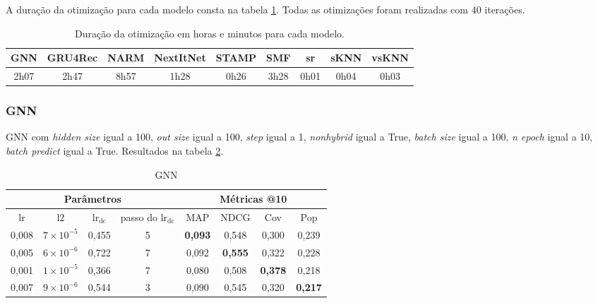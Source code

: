 A duração da otimização para cada modelo consta na tabela
\ref{tab:duration_opt_remaining}. Todas as otimizações foram realizadas com
40 iterações.

\begin{table}[htbp]
  \centering
  \begin{tabular}{|c|c|c|c|c|c|c|c|c|}
      \hline
      GNN & GRU4Rec & NARM & NextItNet & STAMP & SMF & sr & sKNN & vsKNN \\
      \hline
      2h07 & 2h47 & 8h57 & 1h28 & 0h26 & 3h28 & 0h01 & 0h04 & 0h03 \\
      \hline
      \end{tabular}
      \caption{Duração da otimização em horas e minutos para cada modelo.}
      \label{tab:duration_opt_remaining}
\end{table}

\subsubsection{GNN}
GNN com \textit{hidden size} igual a 100, \textit{out size} igual a 100,
\textit{step} igual a 1, \textit{nonhybrid} igual a True, \textit{batch size}
igual a 100, \textit{n epoch} igual a 10, \textit{batch predict} igual a True.
Resultados na tabela \ref{opt:GNN_rem}.

\begin{table}[htbp]
  \centering
  \begin{tabular}{|c|c|c|c|c|c|c|c|}
    \hline
      \multicolumn{4}{|c|}{Parâmetros} & \multicolumn{4}{c|}{Métricas @10} \\
      \hline
      lr & l2 & $\text{lr}_\text{dc}$ &passo do $\text{lr}_\text{dc}$ & MAP & NDCG & Cov & Pop \\
      \hline
      0,008 & $7 \times 10^{-5}$ & 0,455 & 5 & \textbf{0,093} & 0,548 & 0,300 & 0,239 \\
      \hline
      0,005 & $6 \times 10^{-6}$ & 0,722 & 7 & 0,092 & \textbf{0,555} & 0,322 & 0,228 \\
      \hline
      0,001 & $1 \times 10^{-5}$ & 0,366 & 7 & 0,080 & 0,508 & \textbf{0,378} & 0,218 \\
      \hline
      0,007 & $9 \times 10^{-6}$ & 0,544 & 3 & 0,090 & 0,545 & 0,320 & \textbf{0,217} \\
      \hline
\end{tabular}
      \caption{GNN}
      \label{opt:GNN_rem}
\end{table}

